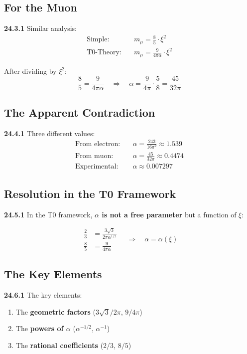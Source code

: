 \subsection{For the Muon}

\noindent \textbf{24.3.1} Similar analysis:
\begin{align*}
	\text{Simple:} &\quad m_\mu = \frac{8}{5} \cdot \xi^2 \\
	\text{T0-Theory:} &\quad m_\mu = \frac{9}{4\pi\alpha} \cdot \xi^2
\end{align*}

After dividing by $\xi^2$:
\[
\frac{8}{5} = \frac{9}{4\pi\alpha}
\quad \Rightarrow \quad
\alpha = \frac{9}{4\pi} \cdot \frac{5}{8} = \frac{45}{32\pi}
\]

\subsection{The Apparent Contradiction}

\noindent \textbf{24.4.1} Three different values:
\begin{align*}
	\text{From electron:} &\quad \alpha = \frac{243}{16\pi^2} \approx 1.539 \\
	\text{From muon:} &\quad \alpha = \frac{45}{32\pi} \approx 0.4474 \\
	\text{Experimental:} &\quad \alpha \approx 0.007297
\end{align*}

\subsection{Resolution in the T0 Framework}

\noindent \textbf{24.5.1} In the T0 framework, \textbf{$\alpha$ is not a free parameter} but a function of $\xi$:

\[
\boxed{
	\begin{aligned}
		\frac{2}{3} &= \frac{3\sqrt{3}}{2\pi\alpha^{1/2}} \\
		\frac{8}{5} &= \frac{9}{4\pi\alpha}
	\end{aligned}
	\quad \Rightarrow \quad
	\alpha = \alpha(\xi)
}
\]

\subsection{The Key Elements}

\noindent \textbf{24.6.1} The key elements:
\begin{enumerate}
	\item The \textbf{geometric factors} ($3\sqrt{3}/2\pi$, $9/4\pi$)
	\item The \textbf{powers of $\alpha$} ($\alpha^{-1/2}$, $\alpha^{-1}$)  
	\item The \textbf{rational coefficients} ($2/3$, $8/5$)
\end{enumerate}

